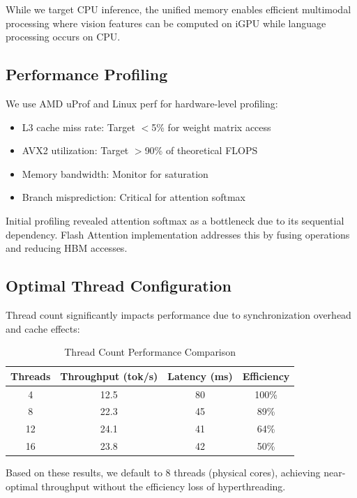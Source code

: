 While we target CPU inference, the unified memory enables efficient multimodal processing where vision features can be computed on iGPU while language processing occurs on CPU.

\subsection{Performance Profiling}

We use AMD uProf and Linux perf for hardware-level profiling:

\begin{itemize}
    \item L3 cache miss rate: Target $<$5\% for weight matrix access
    \item AVX2 utilization: Target $>$90\% of theoretical FLOPS
    \item Memory bandwidth: Monitor for saturation
    \item Branch misprediction: Critical for attention softmax
\end{itemize}

Initial profiling revealed attention softmax as a bottleneck due to its sequential dependency. Flash Attention implementation addresses this by fusing operations and reducing HBM accesses.

\subsection{Optimal Thread Configuration}

Thread count significantly impacts performance due to synchronization overhead and cache effects:

\begin{table}[h]
\centering
\caption{Thread Count Performance Comparison}
\label{tab:thread_comparison}
\begin{tabular}{cccc}
\toprule
\textbf{Threads} & \textbf{Throughput (tok/s)} & \textbf{Latency (ms)} & \textbf{Efficiency} \\
\midrule
4 & 12.5 & 80 & 100\% \\
8 & 22.3 & 45 & 89\% \\
12 & 24.1 & 41 & 64\% \\
16 & 23.8 & 42 & 50\% \\
\bottomrule
\end{tabular}
\end{table}

Based on these results, we default to 8 threads (physical cores), achieving near-optimal throughput without the efficiency loss of hyperthreading.

